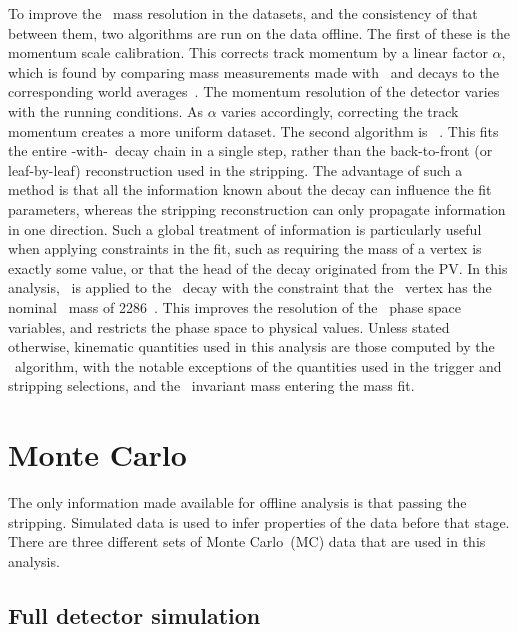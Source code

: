 To improve the \PLambdac\ mass resolution in the datasets, and the consistency 
of that between them, two algorithms are run on the data offline.
The first of these is the momentum scale calibration.
This corrects track momentum by a linear factor $\alpha$, which is found by 
comparing mass measurements made with \JpsiTomumu\ and 
\decay{\PBplus}{\PJpsi\PKplus} decays to the corresponding world 
averages~\cite{Aaij:2014jba}.
The momentum resolution of the detector varies with the running conditions.
As $\alpha$ varies accordingly, correcting the track momentum creates a more 
uniform dataset.
The second algorithm is \decaytreefitter~\cite{Hulsbergen:2005pu}.
This fits the entire \LbToLcmuX-with-\LcTophh\ decay chain in a single step, 
rather than the back-to-front (or leaf-by-leaf) reconstruction used in the 
stripping.
The advantage of such a method is that all the information known about the 
decay can influence the fit parameters, whereas the stripping reconstruction 
can only propagate information in one direction.
Such a global treatment of information is particularly useful when applying 
constraints in the fit, such as requiring the mass of a vertex is exactly some 
value, or that the head of the decay originated from the \ac{PV}.
In this analysis, \decaytreefitter\ is applied to the \PLambdab\ decay with the 
constraint that the \phh\ vertex has the nominal \PLambdac\ mass of 
\SI{2286}{\MeVcc}~\cite{PDG2014}.
This improves the resolution of the \PLambdac\ phase space variables, and 
restricts the phase space to physical values.
Unless stated otherwise, kinematic quantities used in this analysis are those 
computed by the \decaytreefitter\ algorithm, with the notable exceptions of the 
quantities used in the trigger and stripping selections, and the \phh\ 
invariant mass entering the mass fit.

\section{Monte Carlo}
\label{chap:cpv:data:mc}

The only information made available for offline analysis is that passing the 
stripping.
Simulated data is used to infer properties of the data before that stage.
There are three different sets of Monte Carlo~(MC) data that are used in this 
analysis.

\subsection{Full detector simulation}
\label{chap:cpv:data:mc:full}

